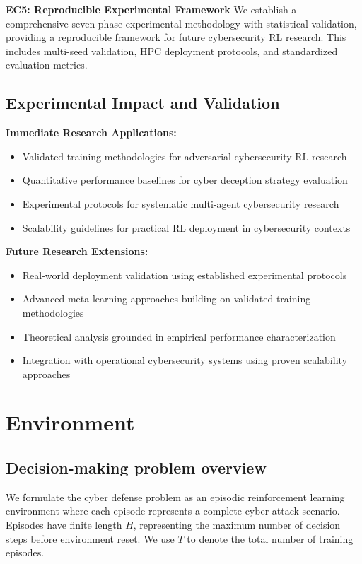 \documentclass[11pt]{article}
\newcounter{phase}[algorithm]
\theoremstyle{definition}
\theoremstyle{plain}
\begin{document}
\textbf{EC5: Reproducible Experimental Framework}
We establish a comprehensive seven-phase experimental methodology with statistical validation, providing a reproducible framework for future cybersecurity RL research. This includes multi-seed validation, HPC deployment protocols, and standardized evaluation metrics.

\subsection{Experimental Impact and Validation}

\textbf{Immediate Research Applications:}
\begin{itemize}
\item Validated training methodologies for adversarial cybersecurity RL research
\item Quantitative performance baselines for cyber deception strategy evaluation  
\item Experimental protocols for systematic multi-agent cybersecurity research
\item Scalability guidelines for practical RL deployment in cybersecurity contexts
\end{itemize}

\textbf{Future Research Extensions:}
\begin{itemize}
\item Real-world deployment validation using established experimental protocols
\item Advanced meta-learning approaches building on validated training methodologies
\item Theoretical analysis grounded in empirical performance characterization
\item Integration with operational cybersecurity systems using proven scalability approaches
\end{itemize}

\section{Environment}

\subsection{Decision-making problem overview}

We formulate the cyber defense problem as an episodic reinforcement learning environment where each episode represents a complete cyber attack scenario. Episodes have finite length $H$, representing the maximum number of decision steps before environment reset. We use $T$ to denote the total number of training episodes.
\end{document}
